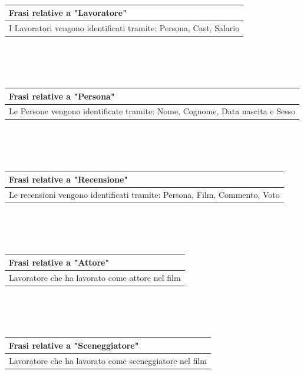 \documentclass[10pt]{article}
\begin{document}
 	\\\\\\
 	\begin{tabular} { |p{16.8cm}| }
 		\hline
 		\rowcolor{lightgray}
 		\textbf{Frasi relative a "Lavoratore"} \\
 		\hline
 		I Lavoratori vengono identificati tramite: Persona, Cast, Salario \\
 		\hline 		
 	\end{tabular} 
 	\\\\\\
 	\begin{tabular} { |p{16.8cm}| }
 		\hline
 		\rowcolor{lightgray}
 		\textbf{Frasi relative a "Persona"} \\
 		\hline
 		Le Persone vengono identificate tramite: Nome, Cognome, Data nascita e Sesso \\
 		\hline 		
 	\end{tabular} 
 	\\\\\\
 	\begin{tabular} { |p{16.8cm}| }
 		\hline
 		\rowcolor{lightgray}
 		\textbf{Frasi relative a "Recensione"} \\
 		\hline
 		Le recensioni vengono identificati tramite: Persona, Film, Commento, Voto \\
 		\hline 		
 	\end{tabular} 
 	\\\\\\
 	\begin{tabular} { |p{16.8cm}| }
 		\hline
 		\rowcolor{lightgray}
 		\textbf{Frasi relative a "Attore"} \\
 		\hline
 		Lavoratore che ha lavorato come attore nel film \\
 		\hline 		
 	\end{tabular} 
	\\\\\\
	\begin{tabular} { |p{16.8cm}| }
		\hline
		\rowcolor{lightgray}
		\textbf{Frasi relative a "Sceneggiatore"} \\
		\hline
		Lavoratore che ha lavorato come sceneggiatore nel film \\
		\hline 		
	\end{tabular} 
	\\\\\\
\end{document}
